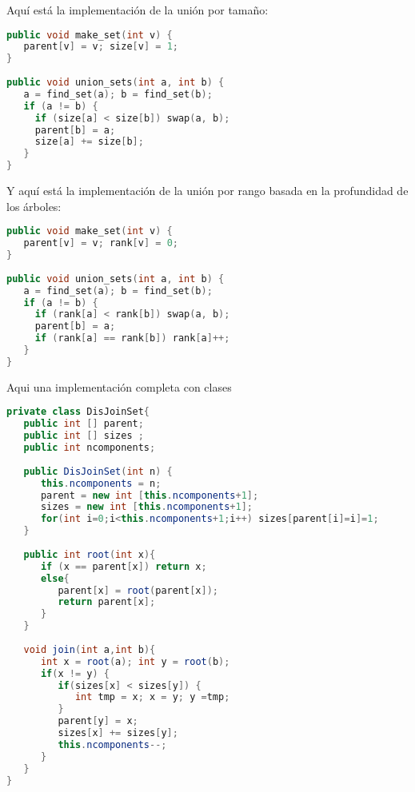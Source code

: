 Aquí está la implementación de la unión por tamaño:

\begin{lstlisting}[language=C++]
public void make_set(int v) {
   parent[v] = v; size[v] = 1;
}
	
public void union_sets(int a, int b) {
   a = find_set(a); b = find_set(b);
   if (a != b) {
     if (size[a] < size[b]) swap(a, b);
     parent[b] = a;
     size[a] += size[b];
   }
}
\end{lstlisting}

Y aquí está la implementación de la unión por rango basada en la profundidad de los árboles:

\begin{lstlisting}[language=C++]
public void make_set(int v) {
   parent[v] = v; rank[v] = 0;
}
	
public void union_sets(int a, int b) {
   a = find_set(a); b = find_set(b);
   if (a != b) {
     if (rank[a] < rank[b]) swap(a, b);
     parent[b] = a;
     if (rank[a] == rank[b]) rank[a]++;
   }
}
\end{lstlisting}

Aqui una implementación completa con clases

\begin{lstlisting}[language=Java]
private class DisJoinSet{
   public int [] parent;
   public int [] sizes ;
   public int ncomponents;
	
   public DisJoinSet(int n) {
      this.ncomponents = n;
      parent = new int [this.ncomponents+1];
      sizes = new int [this.ncomponents+1];
      for(int i=0;i<this.ncomponents+1;i++) sizes[parent[i]=i]=1;
   }
   
   public int root(int x){
      if (x == parent[x]) return x;
      else{
         parent[x] = root(parent[x]);
         return parent[x];
      }
   }
	
   void join(int a,int b){
      int x = root(a); int y = root(b);
      if(x != y) {
         if(sizes[x] < sizes[y]) {
            int tmp = x; x = y; y =tmp;
         }
         parent[y] = x;
         sizes[x] += sizes[y];
         this.ncomponents--;
      }
   }
}
\end{lstlisting}